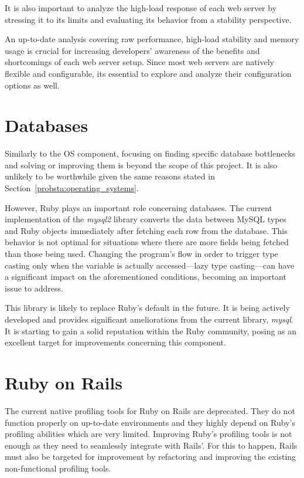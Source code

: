 It is also important to analyze the high-load response of each web server by stressing it to its limits and evaluating its behavior from a stability perspective. 

An up-to-date analysis covering raw performance, high-load stability and memory usage is crucial for increasing developers' awareness of the benefits and shortcomings of each web server setup. Since most web servers are natively flexible and configurable, its essential to explore and analyze their configuration options as well.

\section{Databases}
Similarly to the OS component, focusing on finding specific database bottlenecks and solving or improving them is beyond the scope of this project. It is also unlikely to be worthwhile given the same reasons stated in Section~\ref{probsta:operating_systems}.

However, Ruby plays an important role concerning databases. The current implementation of the \textit{mysql2} library converts the data between MySQL types and Ruby objects immediately after fetching each row from the database. This behavior is not optimal for situations where there are more fields being fetched than those being used. Changing the program's flow in order to trigger type casting only when the variable is actually accessed---lazy type casting---can have a significant impact on the aforementioned conditions, becoming an important issue to address.

This library is likely to replace Ruby's default in the future. It is being actively developed and provides significant ameliorations from the current library, \textit{mysql}. It is starting to gain a solid reputation within the Ruby community, posing as an excellent target for improvements concerning this component.

\section{Ruby on Rails}
The current native profiling tools for Ruby on Rails are deprecated. They do not function properly on up-to-date environments and they highly depend on Ruby's profiling abilities which are very limited. Improving Ruby's profiling tools is not enough as they need to seamlessly integrate with Rails'. For this to happen, Rails must also be targeted for improvement by refactoring and improving the existing non-functional profiling tools.

